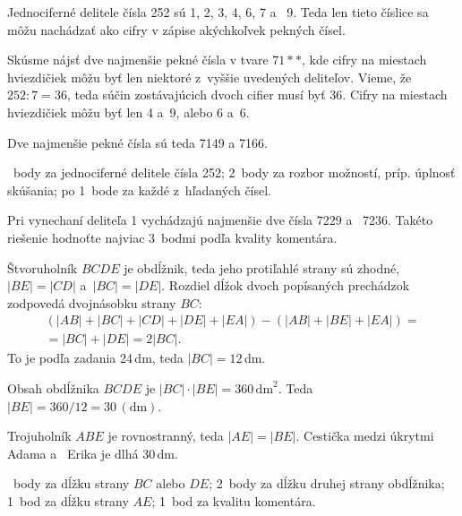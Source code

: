 {%
Jednociferné delitele čísla 252 sú 1, 2, 3, 4, 6, 7 a ~9. Teda len tieto číslice sa môžu nachádzať ako cifry v zápise akýchkoľvek pekných čísel. 

Skúsme nájsť dve najmenšie pekné čísla v tvare $71{*}*$, kde
cifry na miestach hviezdičiek môžu byť len niektoré z~vyššie uvedených deliteľov.
Vieme, že $252:7=36$, teda súčin zostávajúcich dvoch cifier musí byť 36.
Cifry na miestach hviezdičiek môžu byť len 4 a~9, alebo 6 a~6.


Dve najmenšie pekné čísla sú teda 7149 a 7166.

~body za jednociferné delitele čísla 252;
2~body za rozbor možností, príp. úplnosť skúšania;
po 1~bode za každé z~hľadaných čísel.

Pri vynechaní deliteľa 1 vychádzajú najmenšie dve čísla 7229 a ~7236.
Takéto riešenie hodnoťte najviac 3~bodmi podľa kvality komentára.
\endhodnotenie
}

{%
Štvoruholník $BCDE$ je obdĺžnik, teda jeho protiľahlé strany sú zhodné,
$|BE|=|CD|$ a~$|BC|=|DE|$.
Rozdiel dĺžok dvoch popísaných prechádzok zodpovedá dvojnásobku strany $BC$:
$$
\begin{gathered}
  (|AB|+|BC|+|CD|+|DE|+|EA|) - (|AB|+|BE|+|EA|) =\\
  = |BC|+|DE| = 2|BC| .
\end{gathered}
$$
To je podľa zadania 24\,dm, teda $|BC|=12$\,dm.

Obsah obdĺžnika $BCDE$ je
$|BC|\cdot|BE| = 360\,\text{dm}^2$.
Teda $|BE| =360/12 =30\,(\text{dm})$.

Trojuholník $ABE$ je rovnostranný, teda $|AE|=|BE|$.
Cestička medzi úkrytmi Adama a ~Erika je dlhá 30\,dm.

~body za dĺžku strany $BC$ alebo $DE$;
2~body za dĺžku druhej strany obdĺžnika;
1~bod za dĺžku strany $AE$;
1~bod za kvalitu komentára.
\endhodnotenie
}


